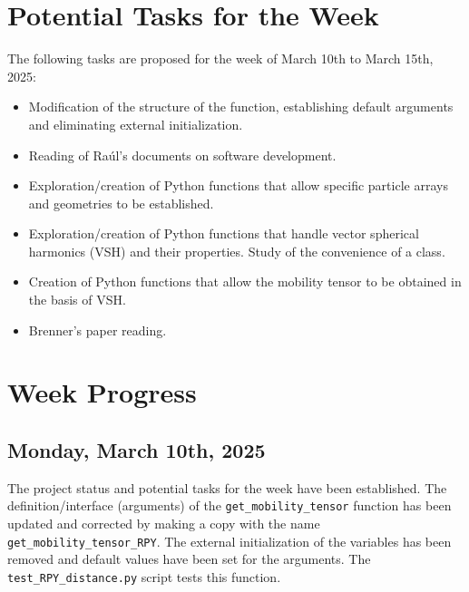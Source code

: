 \documentclass[12pt]{article}
\begin{document}
\section{Potential Tasks for the Week}
The following tasks are proposed for the week of March 10th to March 15th, 2025:
\begin{itemize}
    \item Modification of the structure of the  function, establishing default arguments and eliminating external initialization.
    \item Reading of Raúl's documents on software development.
    \item Exploration/creation of Python functions that allow specific particle arrays and geometries to be established.
    \item Exploration/creation of Python functions that handle vector spherical harmonics (VSH) and their properties. Study of the convenience of a class.
    \item Creation of Python functions that allow the mobility tensor to be obtained in the basis of VSH.
    \item Brenner's paper \cite{BRENNER1961242} reading.
\end{itemize}

\section{Week Progress}

\subsection{Monday, March 10th, 2025}
The project status and potential tasks for the week have been established.
The definition/interface (arguments) of the
\texttt{get\_mobility\_tensor} function has been updated
and corrected by making a copy with the name
\texttt{get\_mobility\_tensor\_RPY}. The external initialization
of the variables has been removed and default values have been
set for the arguments. The \texttt{test\_RPY\_distance.py}
script tests this function.

\printbibliography
\end{document}
